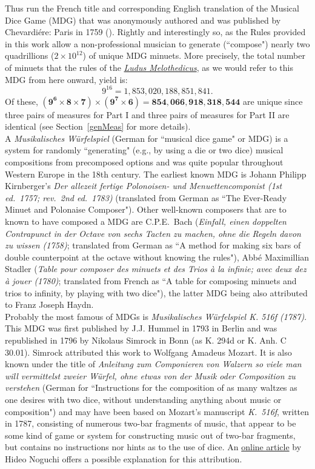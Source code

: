 \documentclass[a4paper,x11names,svgnames,10pt]{article}
\begin{document}
{Thus run the French title and corresponding English translation of the Musical Dice Game (MDG) that was anonymously authored and was published by Chevardi\'{e}re: Paris in 1759 (\citealp{ludus1759}).  Rightly and interestingly so, as the Rules provided in this work allow a non-professional musician to generate (``compose") nearly two quadrillions ($2 \times 10^{12}$) of unique MDG minuets.  More precisely, the total number of minuets that the rules of the \href{https://imslp.org/wiki/Ludus_Melothedicus_(Anonymous)}{{\em Ludus Melothedicus}}, as we would refer to this MDG from here onward, yield is: $$9^{16} = 1\!,853\!,020\!,188\!,851\!,841.$$ 
Of these, $\mathbf{(9^6\times 8\times 7) \times (9^7\times 6) = 854\!,066\!,918\!,318\!,544}$ are unique since three pairs of measures for Part I and three pairs of measures for Part II are identical (see Section~\ref{genMeas} for more details).\\

\noindent A {\it Musikalisches W\"{u}rfelspiel} (German for ``musical dice game" or MDG) is a system for randomly ``generating" (e.g., by using a die or two dice) musical compositions from precomposed options and was quite popular throughout Western Europe in the 18th century.  The earliest known MDG is Johann Philipp Kirnberger's {\em Der allezeit fertige Polonoisen- und Menuettencomponist (1st ed.\ 1757; rev.\ 2nd ed.\ 1783)} (translated from German as ``The Ever-Ready Minuet and Polonaise Composer").  Other well-known composers that are to known to have composed a MDG are C.P.E.\ Bach ({\em Einfall, einen doppelten Contrapunct in der Octave von sechs Tacten zu machen, ohne die Regeln davon zu wissen (1758)}; translated from German as ``A method for making six bars of double counterpoint at the octave without knowing the rules"), Abb\'{e} Maximillian Stadler ({\em Table pour composer des minuets et des Trios \`{a} la infinie; avec deux dez \`{a} jouer (1780)}; translated from French as ``A table for composing minuets and trios to infinity, by playing with two dice"), the latter MDG being also attributed to Franz Joseph Haydn.\\

Probably the most famous of MDGs is {\it Musikalisches W\"{u}rfelspiel K. 516f (1787)}.  This MDG was first published by J.J. Hummel in 1793 in Berlin and was republished in 1796 by Nikolaus Simrock in Bonn (as K. 294d or K. Anh. C 30.01). Simrock attributed this work to Wolfgang Amadeus Mozart. It is also known under the title of {\em Anleitung zum Componieren von Walzern so viele man will vermittelst zweier W\"{u}rfel, ohne etwas von der Musik oder Composition zu verstehen} (German for ``Instructions for the composition of as many waltzes as one desires with two dice, without understanding anything about music or composition") and may have been based on Mozart's manuscript {\em K.\ 516f}, written in 1787, consisting of numerous two-bar fragments of music, that appear to be some kind of game or system for constructing music out of two-bar fragments, but contains no instructions nor hints as to the use of dice.  An \href{(http://www.asahi-net.or.jp/\~rb5h-ngc/e/k516f.htm}{online article} by Hideo Noguchi offers a possible explanation for this attribution.\\

}
\end{document}
